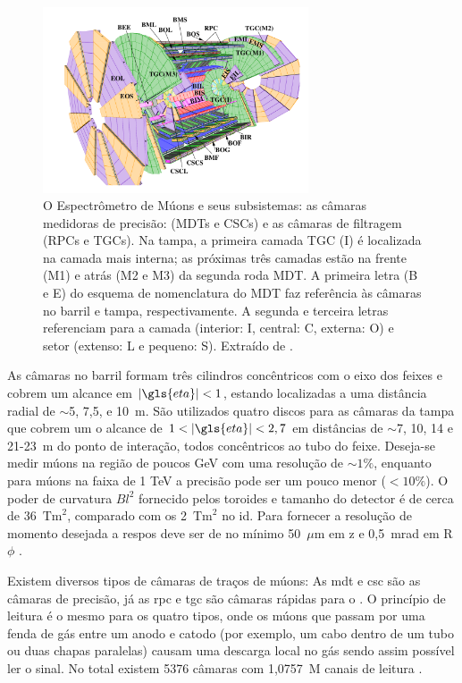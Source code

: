 \begin{figure}[h!t]
\centering
\includegraphics[width=0.7\textwidth]{figures/Muon_system_Initial.pdf}
\caption[O Espectrômetro de Múons]{
O Espectrômetro de Múons e seus subsistemas: as câmaras medidoras de
precisão: (MDTs e CSCs) e as câmaras de filtragem (RPCs e TGCs). Na tampa, a
primeira camada TGC (I) é localizada na camada mais interna; as próximas três
camadas estão na frente (M1) e atrás (M2 e M3) da segunda roda MDT. A primeira
letra (B e E) do esquema de nomenclatura do MDT faz referência às câmaras no barril
e tampa, respectivamente. A segunda e terceira letras referenciam para a camada
(interior: I, central: C, externa: O) e setor (extenso: L e pequeno: S). Extraído de
\cite{paper_atlas}.}
\label{fig:espec_muons}
\end{figure}

As câmaras no barril formam três cilindros
concêntricos com o eixo dos feixes e cobrem um alcance em $|\gls{eta}| < 1$,
estando localizadas a uma distância radial de $\sim$5, 7,5, e 10~m. São
utilizados quatro discos para as câmaras da tampa que cobrem um o alcance de 
$1 < |\gls{eta}| < 2,7$ em distâncias de $\sim$7, 10, 14 e 21-23~m do ponto de
interação, todos concêntricos ao tubo do feixe. Deseja-se medir múons
na região de poucos GeV com uma resolução de $\sim1\%$, enquanto para múons na
faixa de 1 TeV a precisão pode ser um pouco menor ($ < 10\%$). O poder de
curvatura $Bl^2$ fornecido pelos toroides e tamanho do detector é de cerca de 36~$\text{Tm}^2$, 
comparado com os 2~$\text{Tm}^2$ no \gls{id}. Para fornecer a
resolução de momento desejada a \gls{respos} deve ser de no mínimo
50~$\mu$m em z e 0,5~mrad em R$\phi$ \cite{ATLAS_TDR}.

Existem diversos tipos de câmaras de traços de múons: As \gls{mdt} e \gls{csc}
são as câmaras de precisão, já as \gls{rpc} e \gls{tgc} são câmaras
rápidas para o . O princípio de leitura é o mesmo para os quatro
tipos, onde os múons que passam por uma fenda de gás entre um anodo e catodo (por
exemplo, um cabo dentro de um tubo ou duas chapas paralelas) causam uma descarga
local no gás sendo assim possível ler o sinal. No total existem 5376 câmaras
com 1,0757~M canais de leitura \cite{tese_jatos}.

